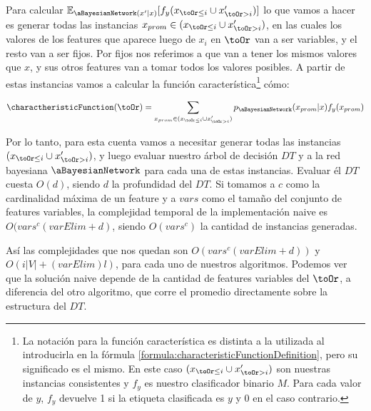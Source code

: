 Para calcular $\mathbb{E}_{\aBayesianNetwork(x' | x)}[f_y(x_{\toOr \leq i} \cup x'_{\toOr > i})]$ lo que vamos a hacer es generar todas las instancias $x_{prom} \in (x_{\toOr \leq i} \cup x'_{\toOr > i})$, en las cuales los valores de los features que aparece luego de $x_i$ en $\toOr$ van a ser variables, y el resto van a ser fijos. Por fijos nos referimos a que van a tener los mismos valores que $x$, y sus otros features van a tomar todos los valores posibles. A partir de estas instancias vamos a calcular la función característica\footnote{La notación para la función característica es distinta a la utilizada al introducirla en la fórmula \ref{formula:characteristicFunctionDefinition}, pero su significado es el mismo. En este caso $(x_{\toOr \leq i} \cup x'_{\toOr > i})$ son nuestras instancias consistentes y $f_y$ es nuestro clasificador binario $M$. Para cada valor de $y$, $f_y$ devuelve 1 si la etiqueta clasificada es $y$ y 0 en el caso contrario.} cómo:

$$\charactheristicFunction(\toOr) = \sum_{x_{prom} \in (x_{\toOr \leq i} \cup x'_{\toOr > i})} p_\aBayesianNetwork(x_{prom} | x) f_y(x_{prom}) $$


Por lo tanto, para esta cuenta vamos a necesitar generar todas las instancias $(x_{\toOr \leq i} \cup x'_{\toOr > i})$, y luego evaluar nuestro árbol de decisión $DT$ y a la red bayesiana $\aBayesianNetwork$ para cada una de estas instancias. Evaluar él $DT$ cuesta $O(d)$, siendo $d$ la profundidad del $DT$. Si tomamos a $c$ como la cardinalidad máxima de un feature y a $vars$ como el tamaño del conjunto de features variables, la complejidad temporal de la implementación naive es $O(vars^c(varElim + d)$, siendo $O(vars^c)$ la cantidad de instancias generadas. 

Así las complejidades que nos quedan son $O(vars^c(varElim + d))$ y $O(i|V| + (varElim)l)$, para cada uno de nuestros algoritmos. Podemos ver que la solución naive depende de la cantidad de features variables del $\toOr$, a diferencia del otro algoritmo, que corre el promedio directamente sobre la estructura del $DT$.



